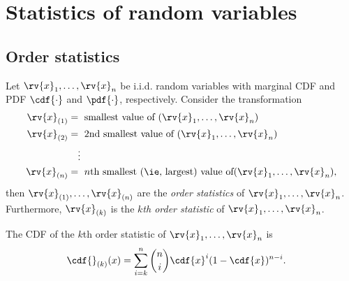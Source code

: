 \section{Statistics of random variables}
\subsection{Order statistics}
\begin{mydefinition}
    Let $\rv{x}_{1},\ldots,\rv{x}_{n}$ be i.i.d. random variables with marginal CDF and PDF $\cdf{\cdot}$ and $\pdf{\cdot}$, respectively. Consider the transformation
    \begin{align}
        \rv{x}_{(1)}&= \text{ smallest value of } (\rv{x}_{1},\ldots,\rv{x}_{n})\\
        \rv{x}_{(2)}&= \text{ 2nd smallest value of } (\rv{x}_{1},\ldots,\rv{x}_{n})\\
        &\quad\vdots\\
        \rv{x}_{(n)}&= \text{ $n$th smallest (\ie, largest) value of} (\rv{x}_{1},\ldots,\rv{x}_{n}),
    \end{align}
    then $\rv{x}_{(1)},\ldots,\rv{x}_{(n)}$ are the \emph{order statistics} of $\rv{x}_{1},\ldots,\rv{x}_{n}$. Furthermore, $\rv{x}_{(k)}$ is the \emph{$k$th order statistic} of $\rv{x}_{1},\ldots,\rv{x}_{n}$.
\end{mydefinition}

\begin{mytheorem}
    The CDF of the $k$th order statistic of $\rv{x}_{1},\ldots,\rv{x}_{n}$ is
    \begin{align}
        \cdf{}_{(k)}(x) &= \sum_{i=k}^{n} {n\choose i} \cdf{x}^{i}(1-\cdf{x})^{n-i}.
    \end{align}
\end{mytheorem}

